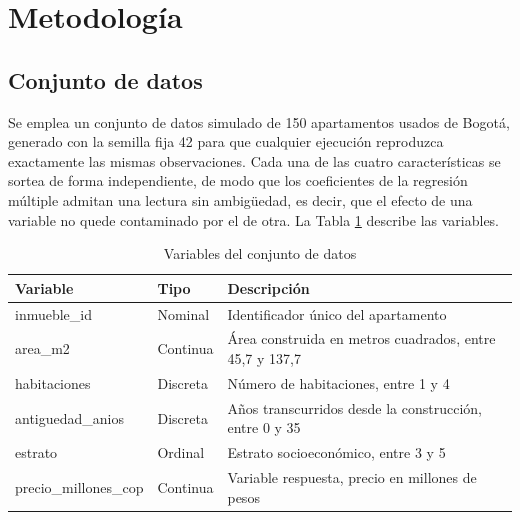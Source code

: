 \section{Metodología}
    \subsection{Conjunto de datos}
        Se emplea un conjunto de datos simulado de 150 apartamentos usados de
        Bogotá, generado con la semilla fija 42 para que cualquier ejecución
        reproduzca exactamente las mismas observaciones. Cada una de las cuatro
        características se sortea de forma independiente, de modo que los
        coeficientes de la regresión múltiple admitan una lectura sin ambigüedad,
        es decir, que el efecto de una variable no quede contaminado por el de
        otra. La Tabla \ref{dataset_variables} describe las variables.

        \begin{table}[H]
            \centering
            \caption{Variables del conjunto de datos}
            \begin{center}
                \begin{tabular}{|l|l|>{\raggedright\arraybackslash}p{3.0cm}|}
                    \hline
                    \textbf{Variable} & \textbf{Tipo} & \textbf{Descripción} \\
                    \hline
                    inmueble\_id & Nominal & Identificador único del apartamento \\
                    \hline
                    area\_m2 & Continua & Área construida en metros cuadrados,
                    entre 45,7 y 137,7 \\
                    \hline
                    habitaciones & Discreta & Número de habitaciones, entre 1 y 4 \\
                    \hline
                    antiguedad\_anios & Discreta & Años transcurridos desde la
                    construcción, entre 0 y 35 \\
                    \hline
                    estrato & Ordinal & Estrato socioeconómico, entre 3 y 5 \\
                    \hline
                    precio\_millones\_cop & Continua & Variable respuesta, precio
                    en millones de pesos \\
                    \hline
                \end{tabular}
                \label{dataset_variables}
            \end{center}
        \end{table}


